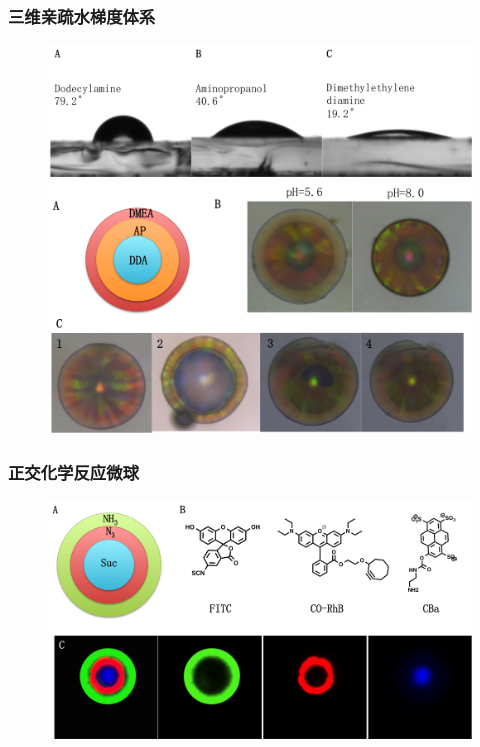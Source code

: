 \documentclass{beamer}
\begin{document}
\begin{frame}
  \frametitle{三维亲疏水梯度体系}
  \begin{figure}
    \begin{center}
      \includegraphics[width=0.5\linewidth]{figures/ch3/FigureS3.png}
      \vfill
      \includegraphics[width=0.8\linewidth]{figures/ch3/Figure3.png}
    \end{center}
  \end{figure}
\end{frame}

\begin{frame}
  \frametitle{正交化学反应微球}
  \begin{figure}
    \begin{center}
      \includegraphics[width=0.8\linewidth]{figures/ch3/Figure4.png}
    \end{center}
  \end{figure}
\end{frame}
\end{document}
